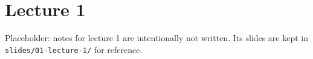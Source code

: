 \documentclass[../../notes.tex]{subfiles}
\begin{document}

\chapter{Lecture 1}\label{ch:l1}

\begin{sourcebox}
Placeholder: notes for lecture 1 are intentionally not written. Its slides are kept in \texttt{slides/01-lecture-1/} for reference.
\end{sourcebox}
\end{document}
